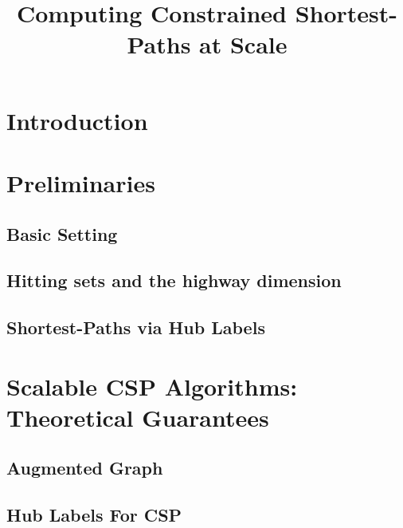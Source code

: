 \documentclass{article}
\title{Computing Constrained Shortest-Paths at Scale}
\author{}
\theoremstyle{plain}
\theoremstyle{definition}
\begin{document}
\maketitle

\begin{abstract}
	
\end{abstract}

\section{Introduction}

%

\section{Preliminaries}
\label{sec:prelim}

\subsection{Basic Setting}
\label{ssec:basic}


\subsection{Hitting sets and the highway dimension}
\label{ssec:hddef}


\subsection{Shortest-Paths via Hub Labels}
\label{ssec:hldef}


\section{Scalable CSP Algorithms:\texorpdfstring{\\}{ } Theoretical Guarantees}
\label{sec:chd}


\subsection{Augmented Graph}
\label{ssec:aug}


\subsection{Hub Labels For CSP}
\label{ssec:hlcsp}

\end{document}
